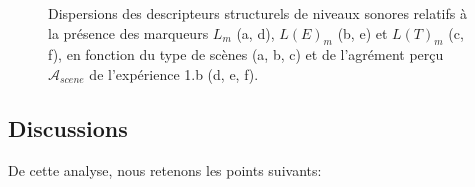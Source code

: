 \documentclass[twoside,twocolumn]{article}
\begin{document}
\begin{figure}[t]
        \caption{Dispersions des descripteurs structurels de niveaux sonores relatifs à la présence des marqueurs $L_m$ (a, d), $L(E)_m$ (b, e) et $L(T)_m$ (c, f), en fonction du type de scènes (a, b, c) et de l'agrément perçu $\mathcal{A}_{scene}$ de l'expérience 1.b (d, e, f).}\label{fig:soundlevelMarker}
\end{figure}

\subsection{Discussions}

De cette analyse, nous retenons les points suivants:
\end{document}
